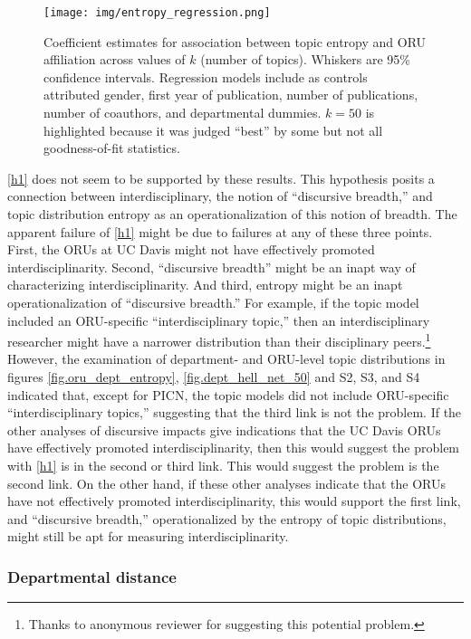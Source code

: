 \documentclass[
  11pt,
]{article}
\begin{document}
\begin{figure}
\centering
\texttt{[image: img/entropy\_regression.png]}
\caption{Coefficient estimates for association between topic entropy and ORU affiliation across values of \(k\) (number of topics). Whiskers are 95\% confidence intervals. Regression models include as controls attributed gender, first year of publication, number of publications, number of coauthors, and departmental dummies. \(k=50%
\) is highlighted because it was judged ``best'' by some but not all goodness-of-fit statistics. \label{fig.reg.entropy}}
\end{figure}

\ref{h1} does not seem to be supported by these results. This hypothesis posits a connection between interdisciplinary, the notion of ``discursive breadth,'' and topic distribution entropy as an operationalization of this notion of breadth. The apparent failure of \ref{h1} might be due to failures at any of these three points. First, the ORUs at UC Davis might not have effectively promoted interdisciplinarity. Second, ``discursive breadth'' might be an inapt way of characterizing interdisciplinarity. And third, entropy might be an inapt operationalization of ``discursive breadth.'' For example, if the topic model included an ORU-specific ``interdisciplinary topic,'' then an interdisciplinary researcher might have a narrower distribution than their disciplinary peers.\footnote{Thanks to anonymous reviewer for suggesting this potential problem.} However, the examination of department- and ORU-level topic distributions in figures \ref{fig.oru_dept_entropy}, \ref{fig.dept_hell_net_50} and S2, S3, and S4 indicated that, except for PICN, the topic models did not include ORU-specific ``interdisciplinary topics,'' suggesting that the third link is not the problem. If the other analyses of discursive impacts give indications that the UC Davis ORUs have effectively promoted interdisciplinarity, then this would suggest the problem with \ref{h1} is in the second or third link. This would suggest the problem is the second link. On the other hand, if these other analyses indicate that the ORUs have not effectively promoted interdisciplinarity, this would support the first link, and ``discursive breadth,'' operationalized by the entropy of topic distributions, might still be apt for measuring interdisciplinarity.

\hypertarget{departmental-distance}{%
\subsubsection{Departmental distance}\label{departmental-distance}}
\end{document}
